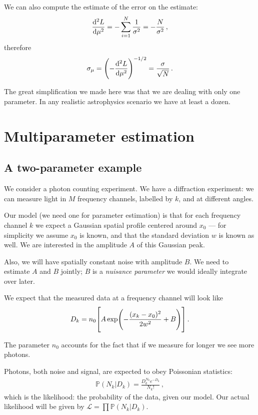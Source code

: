 \documentclass[main.tex]{subfiles}
\begin{document}
We can also compute the estimate of the error on the estimate: 
%
\begin{align}
\dv[2]{L}{\mu } =- \sum_{i=1}^{N} \frac{1}{\sigma^2} = - \frac{N}{\sigma^2}
\,,
\end{align}
%
therefore 
%
\begin{align}
\sigma_\mu = \qty(- \dv[2]{L}{\mu })^{-1/2} = \frac{\sigma}{\sqrt{N}}
\,.
\end{align}

The great simplification we made here was that we are dealing with only one parameter.
In any realistic astrophysics scenario we have at least a dozen. 

\section{Multiparameter estimation}

\subsection{A two-parameter example}

We consider a photon counting experiment. 
We have a diffraction experiment: we can measure light in \(M\) frequency channels, labelled by \(k\), and at different angles. 

Our model (we need one for parameter estimation) is that for each frequency channel \(k\) we expect a Gaussian spatial profile centered around \(x_0 \) --- for simplicity we assume \(x_0 \) is known, and that the standard deviation \(w\) is known as well.
We are interested in the amplitude \(A\) of this Gaussian peak.

Also, we will have spatially constant noise with amplitude \(B\).
We need to estimate \(A\) and \(B\) jointly; \(B\) is a \emph{nuisance parameter} we would ideally integrate over later. 

We expect that the measured data at a frequency channel will look like 
%
\begin{align}
D_k = n_0 \qty[ A\exp(- \frac{(x_k - x_0)^2}{2 w^2} + B)]
\,.
\end{align}

The parameter \(n_0 \) accounts for the fact that if we measure for longer we see more photons. 

Photons, both noise and signal, are expected to obey Poissonian statistics: 
%
\begin{align}
\mathbb{P}(N_k | D_k) = \frac{D_k^{N_k} e^{- D_k}}{N_k!}
\,,
\end{align}
%
which is the likelihood: the probability of the data, given our model. 
Our actual likelihood will be given by \(\mathscr{L} = \prod \mathbb{P}(N_k | D_k)\).
\end{document}
